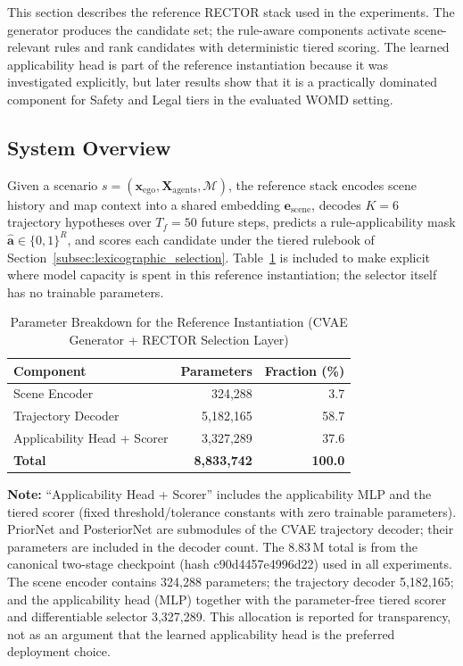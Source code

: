 This section describes the reference RECTOR stack used in the experiments. The generator produces the candidate set; the rule-aware components activate scene-relevant rules and rank candidates with deterministic tiered scoring. The learned applicability head is part of the reference instantiation because it was investigated explicitly, but later results show that it is a practically dominated component for Safety and Legal tiers in the evaluated WOMD setting.

\subsection{System Overview}
\label{subsec:system_overview}

Given a scenario $s{=}(\mathbf{x}_{\text{ego}},\mathbf{X}_{\text{agents}},\mathcal{M})$, the reference stack encodes scene history and map context into a shared embedding $\mathbf{e}_{\text{scene}}$, decodes $K{=}6$ trajectory hypotheses over $T_f{=}50$ future steps, predicts a rule-applicability mask $\hat{\mathbf{a}}\in\{0,1\}^{R}$, and scores each candidate under the tiered rulebook of Section~\ref{subsec:lexicographic_selection}. Table~\ref{tab:param_breakdown} is included to make explicit where model capacity is spent in this reference instantiation; the selector itself has no trainable parameters.

\begin{table}[h]
\centering
\small
\caption{Parameter Breakdown for the Reference Instantiation (CVAE Generator + RECTOR Selection Layer)}
\label{tab:param_breakdown}
\begin{tabular}{lrr}
\toprule
\textbf{Component} & \textbf{Parameters} & \textbf{Fraction (\%)} \\
\midrule
Scene Encoder & 324,288 & 3.7 \\
Trajectory Decoder & 5,182,165 & 58.7 \\
Applicability Head + Scorer & 3,327,289 & 37.6 \\
\midrule
\textbf{Total} & \textbf{8,833,742} & \textbf{100.0} \\
\bottomrule
\end{tabular}
\end{table}

\noindent\small\textbf{Note:} ``Applicability Head + Scorer'' includes the applicability MLP and the tiered scorer (fixed threshold/tolerance constants with zero trainable parameters).  PriorNet and PosteriorNet are submodules of the CVAE trajectory decoder; their parameters are included in the decoder count.  The 8.83\,M total is from the canonical two-stage checkpoint (hash c90d4457e4996d22) used in all experiments.  The scene encoder contains 324{,}288 parameters; the trajectory decoder 5{,}182{,}165; and the applicability head (MLP) together with the parameter-free tiered scorer and differentiable selector 3{,}327{,}289.  This allocation is reported for transparency, not as an argument that the learned applicability head is the preferred deployment choice.


